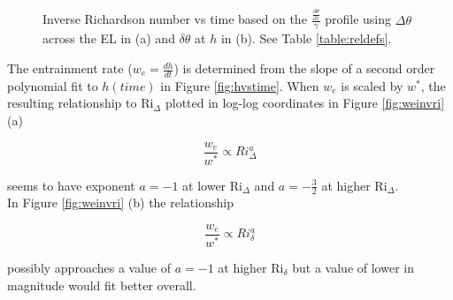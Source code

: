 \begin{figure}[htbp]

\begin{minipage}[b]{0.5\linewidth}
         
        \\
        \end{minipage}             
\quad
\begin{minipage}[b]{0.5\linewidth}
        \\
       
       \end{minipage}
        \caption[Richardson numbers based on $\frac{\frac{\partial \overline{\theta}}{\partial z}}{\gamma}$]{Inverse Richardson number vs time based on the $\frac{\frac{\partial \overline{\theta}}{\partial z}}{\gamma}$
profile using $\Delta \theta$ across the \acs{EL} in (a) and $\delta \theta$ at $h$ in (b).  See Table \ref{table:reldefs}.}
        \label{fig:invristime}
\end{figure}

\clearpage

The entrainment rate ($w_{e}= \frac{dh}{dt}$) is determined from the slope of a second order polynomial fit to $h(time)$ in Figure \ref{fig:hvstime}.  When $w_{e}$ is scaled by $w^{*}$, the resulting relationship to \acs{Ri}$_{\Delta}$ plotted in log-log coordinates 
in Figure \ref{fig:weinvri} (a) 

\begin{equation}
\frac{w_{e}}{w^{*}} \propto Ri_{\Delta}^{a}
\end{equation}

seems to have exponent $a = -1$ at lower \acs{Ri}$_{\Delta}$ and $a = -\frac{3}{2}$ at higher \acs{Ri}$_{\Delta}$.\\

In Figure \ref{fig:weinvri} (b) the relationship

\begin{equation}
\frac{w_{e}}{w^{*}} \propto Ri_{\delta}^{a}
\end{equation}

possibly approaches a value of $a = -1$ at higher \acs{Ri}$_{\delta}$ but a value of lower in magnitude would fit better overall. \\    

